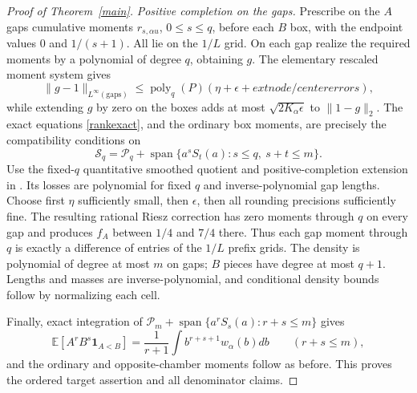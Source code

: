 \documentclass[11pt]{article}
\newcommand{\PP}{\mathcal P}
\begin{document}
\begin{proof}[Proof of Theorem~\ref{main}]
\emph{Positive completion on the gaps.}
Prescribe on the $A$ gaps cumulative moments $r_{s,\alpha u}$,
$0\le s\le q$, before each $B$ box, with the endpoint values
$0$ and $1/(s+1)$. All lie on the $1/L$ grid. On each gap realize
the required moments by a polynomial of degree $q$, obtaining $g$.
The elementary rescaled moment system gives
\[
 \|g-1\|_{L^\infty(\mathrm{gaps})}
 \le \operatorname{poly}_q(P)(\eta+\epsilon+	ext{node/center errors}),
\]
while extending $g$ by zero on the boxes adds at most
$\sqrt{2K_\alpha\epsilon}$ to $\|1-g\|_2$.
The exact equations \eqref{rankexact}, and the ordinary box moments,
are precisely the compatibility conditions on
\[
 \mathcal S_q=\PP_q+\operatorname{span}\{a^sS_t(a):s\le q,\ s+t\le m\}.
\]
Use the fixed-$q$ quantitative smoothed quotient and positive-completion
extension in
.
Its losses are polynomial for fixed $q$ and inverse-polynomial gap
lengths. Choose first $\eta$ sufficiently small, then $\epsilon$,
then all rounding precisions sufficiently fine. The resulting rational
Riesz correction has zero moments through $q$ on every gap and produces
$f_A$ between $1/4$ and $7/4$ there. Thus each gap moment through $q$
is exactly a difference of entries of the $1/L$ prefix grids.
The density is polynomial of degree at most $m$ on gaps; $B$ pieces
have degree at most $q+1$. Lengths and masses are inverse-polynomial,
and conditional density bounds follow by normalizing each cell.

Finally, exact integration of
$\PP_m+\operatorname{span}\{a^rS_s(a):r+s\le m\}$ gives
\[
 \mathbb E[A^rB^s\mathbf1_{A<B}]
 =\frac1{r+1}\int b^{r+s+1}w_\alpha(b)db
       \qquad(r+s\le m),
\]
and the ordinary and opposite-chamber moments follow as before.
This proves the ordered target assertion and all denominator claims.
\end{proof}
\end{document}
